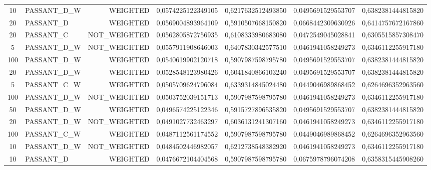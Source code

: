 \begin{table}[H]
{\begin{tabular}{ c l r c c c c }
				10 & PASSANT\_D\_W &   WEIGHTED & 0,0574225122349105 & 0,6217632512493850 & 0,0495691529553707 & 0,6382381444815820 \\
				
				20 &  PASSANT\_D &   WEIGHTED & 0,0569004893964109 & 0,5910507668150820 & 0,0668442309630926 & 0,6414757672167860 \\
				
				20 &  PASSANT\_C & NOT\_WEIGHTED & 0,0562805872756935 & 0,6108333980683080 & 0,0472549045028841 & 0,6305515857308470 \\
				
				5 & PASSANT\_D\_W & NOT\_WEIGHTED & 0,0557911908646003 & 0,6407830342577510 & 0,0461941058249273 & 0,6346112255917180 \\
				
				100 & PASSANT\_D\_W &   WEIGHTED & 0,0540619902120718 & 0,5907987598795780 & 0,0495691529553707 & 0,6382381444815820 \\
				
				20 & PASSANT\_D\_W &   WEIGHTED & 0,0528548123980426 & 0,6041840866103240 & 0,0495691529553707 & 0,6382381444815820 \\
				
				5 & PASSANT\_C\_W &   WEIGHTED & 0,0505709624796084 & 0,6339314845024480 & 0,0449046989868452 & 0,6264696352963560 \\
				
				100 & PASSANT\_D\_W & NOT\_WEIGHTED & 0,0503752039151713 & 0,5907987598795780 & 0,0461941058249273 & 0,6346112255917180 \\
				
				50 & PASSANT\_D\_W &   WEIGHTED & 0,0496574225122346 & 0,5915727896535820 & 0,0495691529553707 & 0,6382381444815820 \\
				
				20 & PASSANT\_D\_W & NOT\_WEIGHTED & 0,0491027732463297 & 0,6036131241307160 & 0,0461941058249273 & 0,6346112255917180 \\
				
				100 & PASSANT\_C\_W &   WEIGHTED & 0,0487112561174552 & 0,5907987598795780 & 0,0449046989868452 & 0,6264696352963560 \\
				
				10 & PASSANT\_D\_W & NOT\_WEIGHTED & 0,0484502446982057 & 0,6212738548382920 & 0,0461941058249273 & 0,6346112255917180 \\
				
				10 &  PASSANT\_D &   WEIGHTED & 0,0476672104404568 & 0,5907987598795780 & 0,0675978796074208 & 0,6358315445908260 \\
				

\end{tabular}}
\end{table}
